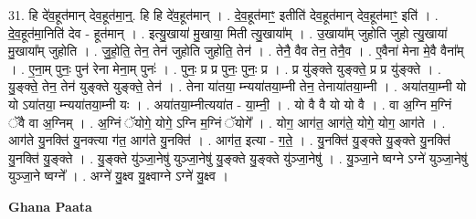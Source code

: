\documentclass[17pt]{extarticle}
\begin{document}
31. हि दे॑व॒हूत॑मान् देव॒हूत॑मा॒न्॒. हि हि दे॑व॒हूत॑मान् । . दे॒व॒हूत॑माꣳ॒॒ इतीति॑ देव॒हूत॑मान् देव॒हूत॑माꣳ॒॒ इति॑ । . दे॒व॒हूत॑मा॒निति॑ देव - हूत॑मान् । . इत्यु॒खाया॑ मु॒खाया॒ मिती त्यु॒खाया᳚म् । . उ॒खाया᳚म् जुहोति जुहो त्यु॒खाया॑ मु॒खाया᳚म् जुहोति । . जु॒हो॒ति॒ तेन॒ तेन॑ जुहोति जुहोति॒ तेन॑ । . तेनै॒ वैव तेन॒ तेनै॒व । . ए॒वैना॑ मेना मे॒वै वैना᳚म् । . ए॒ना॒म् पुनः॒ पुन॑ रेना मेना॒म् पुनः॑ । . पुनः॒ प्र प्र पुनः॒ पुनः॒ प्र । . प्र यु॑ङ्क्ते युङ्क्ते॒ प्र प्र यु॑ङ्क्ते । . यु॒ङ्क्ते॒ तेन॒ तेन॑ युङ्क्ते युङ्क्ते॒ तेन॑ । . तेना या॑तया॒ म्न्यया॑तया॒म्नी तेन॒ तेनाया॑तया॒म्नी । . अया॑तया॒म्नी यो यो ऽया॑तया॒ म्न्यया॑तया॒म्नी यः । . अया॑तया॒म्नीत्यया॑त - या॒म्नी॒ । . यो वै वै यो यो वै । . वा अ॒ग्नि म॒ग्निं ॅवै वा अ॒ग्निम् । . अ॒ग्निं ॅयोगे॒ योगे॒ ऽग्नि म॒ग्निं ॅयोगे᳚ । . योग॒ आग॑त॒ आग॑ते॒ योगे॒ योग॒ आग॑ते । . आग॑ते यु॒नक्ति॑ यु॒नक्त्या ग॑त॒ आग॑ते यु॒नक्ति॑ । . आग॑त॒ इत्या - ग॒ते॒ । . यु॒नक्ति॑ यु॒ङ्क्ते यु॒ङ्क्ते यु॒नक्ति॑ यु॒नक्ति॑ यु॒ङ्क्ते । . यु॒ङ्क्ते यु॑ञ्जा॒नेषु॑ युञ्जा॒नेषु॑ यु॒ङ्क्ते यु॒ङ्क्ते यु॑ञ्जा॒नेषु॑ । . यु॒ञ्जा॒ने ष्वग्ने ऽग्ने॑ युञ्जा॒नेषु॑ युञ्जा॒ने ष्वग्ने᳚ । . अग्ने॑ यु॒क्ष्व यु॒क्ष्वाग्ने ऽग्ने॑ यु॒क्ष्व । \newline

\textbf{Ghana Paata } \newline
\end{document}

